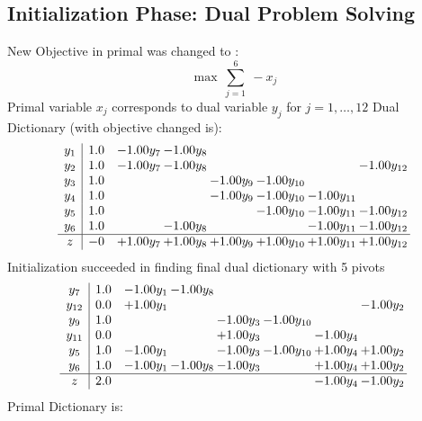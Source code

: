 \documentclass[8pt]{article}
\begin{document}
\subsection{Initialization Phase: Dual Problem Solving}
New Objective in primal was changed to : \[ \max\ \sum_{j=1}^{6}\ - x_j \] 
Primal variable $x_j$ corresponds to dual variable $y_j$ for $j = 1,\ldots,12$
Dual Dictionary (with objective changed is): 
\[\begin{array}{c| c c@{\hskip 2pt} c@{\hskip 2pt} c@{\hskip 2pt} c@{\hskip 2pt} c@{\hskip 2pt} c@{\hskip 2pt} }
 y_{1}   &  1.0 & -1.00 y_{7} & -1.00 y_{8} &    &    &    &   \\
 y_{2}   &  1.0 & -1.00 y_{7} & -1.00 y_{8} &    &    &   & -1.00 y_{12}\\
 y_{3}   &  1.0  &    &   & -1.00 y_{9} & -1.00 y_{10} &    &   \\
 y_{4}   &  1.0  &    &   & -1.00 y_{9} & -1.00 y_{10} & -1.00 y_{11} &   \\
 y_{5}   &  1.0  &    &    &   & -1.00 y_{10} & -1.00 y_{11} & -1.00 y_{12}\\
 y_{6}   &  1.0  &   & -1.00 y_{8} &    &   & -1.00 y_{11} & -1.00 y_{12}\\
\hline
z    &  -0 & +  1.00 y_{7} & +  1.00 y_{8} & +  1.00 y_{9} & +  1.00 y_{10} & +  1.00 y_{11} & +  1.00 y_{12}\\
\end{array}\]
Initialization succeeded in finding final dual dictionary with 5 pivots
\[\begin{array}{c| c c@{\hskip 2pt} c@{\hskip 2pt} c@{\hskip 2pt} c@{\hskip 2pt} c@{\hskip 2pt} c@{\hskip 2pt} }
 y_{7}   &  1.0 & -1.00 y_{1} & -1.00 y_{8} &    &    &    &   \\
 y_{12}   &  0.0 & +  1.00 y_{1} &    &    &    &   & -1.00 y_{2}\\
 y_{9}   &  1.0  &    &   & -1.00 y_{3} & -1.00 y_{10} &    &   \\
 y_{11}   &  0.0  &    &   & +  1.00 y_{3} &   & -1.00 y_{4} &   \\
 y_{5}   &  1.0 & -1.00 y_{1} &   & -1.00 y_{3} & -1.00 y_{10} & +  1.00 y_{4} & +  1.00 y_{2}\\
 y_{6}   &  1.0 & -1.00 y_{1} & -1.00 y_{8} & -1.00 y_{3} &   & +  1.00 y_{4} & +  1.00 y_{2}\\
\hline
z    &  2.0  &    &    &    &   & -1.00 y_{4} & -1.00 y_{2}\\
\end{array}\]
Primal Dictionary is:
\end{document}
